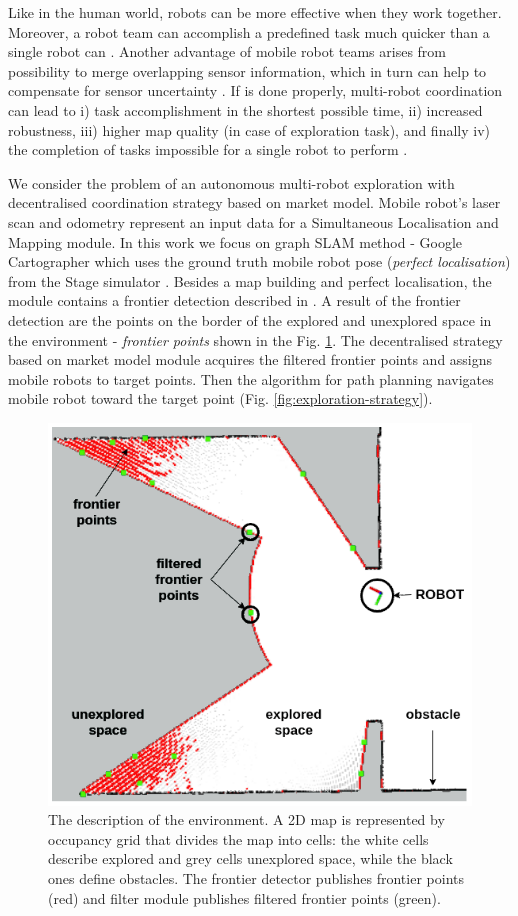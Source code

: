 \documentclass[letterpaper, 10 pt, conference]{ieeeconf}  %
\begin{document}
 Like in the human world, robots can be more effective when they work together. Moreover, a robot team can accomplish a predefined task much quicker than a single robot can \cite{free-market}. Another advantage of mobile robot teams arises from possibility to merge overlapping sensor information, which in turn can help to compensate for sensor uncertainty \cite{segmentation}.
If is done properly, multi-robot coordination can lead to i) task accomplishment in the shortest possible time, ii) increased robustness, iii) higher map quality (in case of exploration task), and finally iv) the completion of tasks impossible for a single robot to perform \cite{survey-analysis}.

We consider the problem of an autonomous multi-robot exploration with decentralised coordination strategy based on market model. Mobile robot's laser scan and odometry represent an input data for a Simultaneous Localisation and Mapping module. In this work we focus on graph SLAM method - Google Cartographer \cite{cartographer} which uses the ground truth mobile robot pose (\textit {perfect localisation}) from the Stage simulator \cite{Stage}. Besides a map building and perfect localisation, the module contains a frontier detection described in \cite{juraj}. A result of the frontier detection are the points on the border of the explored and unexplored space in the environment - \textit{frontier points} shown in the Fig. \ref{fig:environment}. The decentralised strategy based on market model module acquires the filtered frontier points and assigns mobile robots to target points. Then the algorithm for path planning navigates mobile robot toward the target point (Fig. \ref{fig:exploration-strategy}).      

\begin{figure}[t]
	\centering\includegraphics[width=0.85\columnwidth]{frontier_rviz_vol3.png}
	\caption {The description of the environment. A 2D map is represented by occupancy grid that divides the map into cells: the white cells describe explored and grey cells unexplored space, while the black ones define obstacles. The frontier detector publishes frontier points (red) and filter module publishes filtered frontier points (green).}
	\label{fig:environment}
\end{figure}
\end{document}
